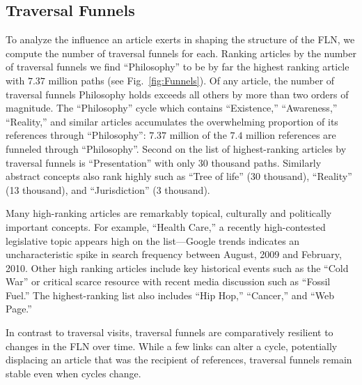 \documentclass[pre,twocolumn,twoside,superscriptaddress,floatfix]{revtex4-1}
\begin{document}
{\subsection{Traversal Funnels}
\label{Traversal Funnels}

To analyze the influence an article exerts in shaping the 
structure of the FLN, we compute the number of traversal funnels for each.
Ranking articles by the number of traversal funnels we find 
``Philosophy'' to be by far the highest ranking article with 
$7.37$ million paths
(see Fig.~\ref{fig:Funnels}).
Of any article, the number of traversal funnels Philosophy holds exceeds 
all others by more than two orders of magnitude.
The ``Philosophy'' cycle which contains ``Existence,'' ``Awareness,'' ``Reality,'' 
and similar articles accumulates the overwhelming proportion of its 
references through ``Philosophy'': $7.37$ million of the $7.4$ million references
are funneled through ``Philosophy''.
Second on the list of highest-ranking articles by traversal funnels is 
``Presentation'' with only $30$ thousand paths. Similarly abstract 
concepts also rank highly such as ``Tree of life'' (30 thousand), 
``Reality'' (13 thousand), and ``Jurisdiction'' (3 thousand).

Many high-ranking articles are remarkably topical, culturally and politically important concepts.  For example, ``Health Care,'' a recently high-contested legislative topic appears high on the list---Google trends indicates an uncharacteristic spike in search frequency between August, 2009 and February, 2010.
Other high ranking articles include key historical events such as the ``Cold War'' or critical scarce resource with recent 
media discussion such as ``Fossil Fuel.'' 
The highest-ranking list also includes ``Hip Hop,'' ``Cancer,'' and ``Web Page.''

In contrast to traversal visits, traversal funnels are comparatively resilient to changes in the FLN over time. 
While a few links can alter a cycle, potentially displacing an article that was the recipient of references, traversal funnels remain stable even when cycles change.

}
\end{document}
